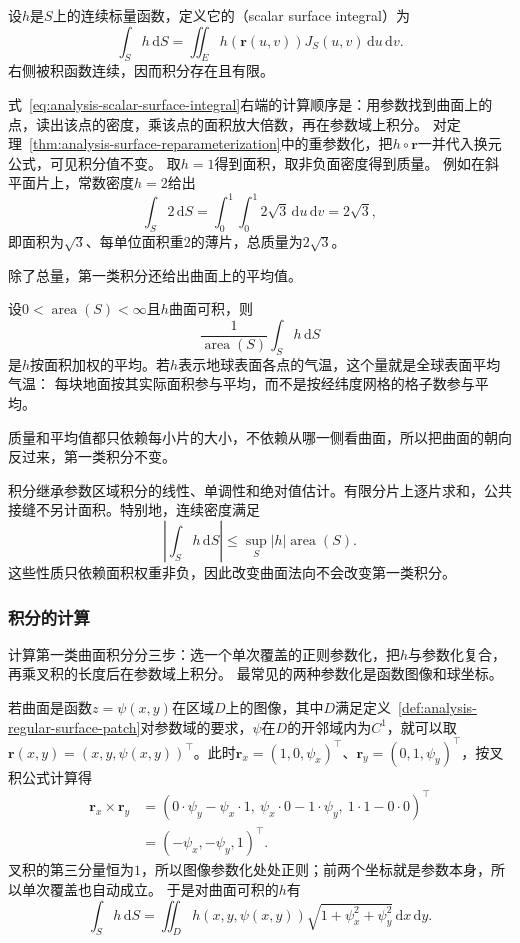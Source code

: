 \begin{definition}[第一类曲面积分]
\label{def:analysis-scalar-surface-integral}
设$h$是$S$上的连续标量函数，定义它的（scalar surface integral）为
\begin{equation}
 \int_Sh\,\mathrm dS
 =\iint_Eh(\bm r(u,v))J_S(u,v)\,\mathrm du\,\mathrm dv.
 \label{eq:analysis-scalar-surface-integral}
\end{equation}
右侧被积函数连续，因而积分存在且有限。
\end{definition}

式~\eqref{eq:analysis-scalar-surface-integral}右端的计算顺序是：用参数找到曲面上的点，读出该点的密度，乘该点的面积放大倍数，再在参数域上积分。
对定理~\ref{thm:analysis-surface-reparameterization}中的重参数化，把$h\circ\bm r$一并代入换元公式，可见积分值不变。
取$h=1$得到面积，取非负面密度得到质量。
例如在斜平面片上，常数密度$h=2$给出
\[
 \int_S2\,\mathrm dS=\int_0^1\int_0^1 2\sqrt3\,\mathrm du\,\mathrm dv=2\sqrt3,
\]
即面积为$\sqrt3$、每单位面积重$2$的薄片，总质量为$2\sqrt3$。

除了总量，第一类积分还给出曲面上的平均值。

设$0<\operatorname{area}(S)<\infty$且$h$曲面可积，则
\[
 \frac1{\operatorname{area}(S)}\int_Sh\,\mathrm dS
\]
是$h$按面积加权的平均。若$h$表示地球表面各点的气温，这个量就是全球表面平均气温：
每块地面按其实际面积参与平均，而不是按经纬度网格的格子数参与平均。

质量和平均值都只依赖每小片的大小，不依赖从哪一侧看曲面，所以把曲面的朝向反过来，第一类积分不变。

积分继承参数区域积分的线性、单调性和绝对值估计。有限分片上逐片求和，公共接缝不另计面积。特别地，连续密度满足
\[
 \left|\int_S h\,\mathrm dS\right|\leq\sup_S|h|\operatorname{area}(S).
\]
这些性质只依赖面积权重非负，因此改变曲面法向不会改变第一类积分。

\subsubsection{积分的计算}

计算第一类曲面积分分三步：选一个单次覆盖的正则参数化，把$h$与参数化复合，再乘叉积的长度后在参数域上积分。
最常见的两种参数化是函数图像和球坐标。

若曲面是函数$z=\psi(x,y)$在区域$D$上的图像，其中$D$满足定义~\ref{def:analysis-regular-surface-patch}对参数域的要求，$\psi$在$D$的开邻域内为$C^1$，就可以取
$\bm r(x,y)=(x,y,\psi(x,y))^\top$。此时$\bm r_x=(1,0,\psi_x)^\top$、$\bm r_y=(0,1,\psi_y)^\top$，按叉积公式计算得
\[
 \begin{aligned}
 \bm r_x\times\bm r_y
 &=(0\cdot\psi_y-\psi_x\cdot1,\ \psi_x\cdot0-1\cdot\psi_y,\ 1\cdot1-0\cdot0)^\top\\
 &=(-\psi_x,-\psi_y,1)^\top.
 \end{aligned}
\]
叉积的第三分量恒为$1$，所以图像参数化处处正则；前两个坐标就是参数本身，所以单次覆盖也自动成立。
于是对曲面可积的$h$有
\[
 \int_Sh\,\mathrm dS
 =\iint_Dh(x,y,\psi(x,y))\sqrt{1+\psi_x^2+\psi_y^2}\,\mathrm dx\,\mathrm dy.
\]

